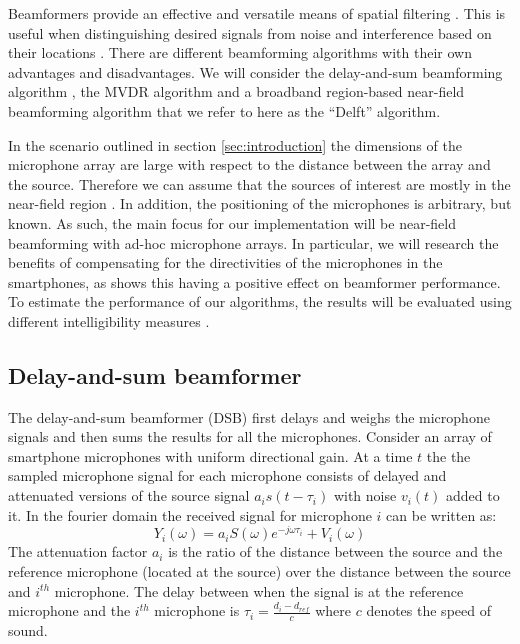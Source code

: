 Beamformers provide an effective and versatile means of spatial filtering \cite{VanVeen19884}. This is useful when distinguishing desired signals from noise and interference based on their locations \cite{himawan2011}. There are different beamforming algorithms with their own advantages and disadvantages. We will consider the delay-and-sum beamforming algorithm \cite{elko1996}, the MVDR algorithm \cite{springer2010} and a broadband region-based near-field beamforming algorithm \cite{martinez2015} that we refer to here as the ``Delft'' algorithm.

In the scenario outlined in section \ref{sec:introduction} the dimensions of the microphone array are large with respect to the distance between the array and the source. Therefore we can assume that the sources of interest are mostly in the near-field region \cite{Gaubitch2014}. In addition, the positioning of the microphones is arbitrary, but known. As such, the main focus for our implementation will be near-field beamforming with ad-hoc microphone arrays. In particular, we will research the benefits of compensating for the directivities of the microphones in the smartphones, as \cite{Gaubitch2014} shows this having a positive effect on beamformer performance. To estimate the performance of our algorithms, the results will be evaluated using different intelligibility measures \cite{taal2010,rix2001}.

\subsection{Delay-and-sum beamformer}
The delay-and-sum beamformer (DSB) first delays and weighs the microphone signals and then sums the results for all the microphones.
Consider an array of smartphone microphones with uniform directional gain. At a time $t$ the the sampled microphone signal for each microphone consists of delayed and attenuated versions of the source signal $a_{i}s(t-\tau_{i})$ with noise $v_{i}(t)$ added to it. In the fourier domain the received signal for microphone $i$ can be written as:
\[
Y_{i}(\omega) = a_{i}S(\omega)e^{-j\omega\tau_{i}} + V_{i}(\omega)
\]
The attenuation factor $a_{i}$ is the ratio of the distance between the source and the reference microphone (located at the source) over the distance between the source and $i^{th}$ microphone. The delay between when the signal is at the reference microphone and the $i^{th}$ microphone is $\tau_{i} = \frac{d_{i}-d_{ref}}{c}$ where $c$ denotes the speed of sound.

